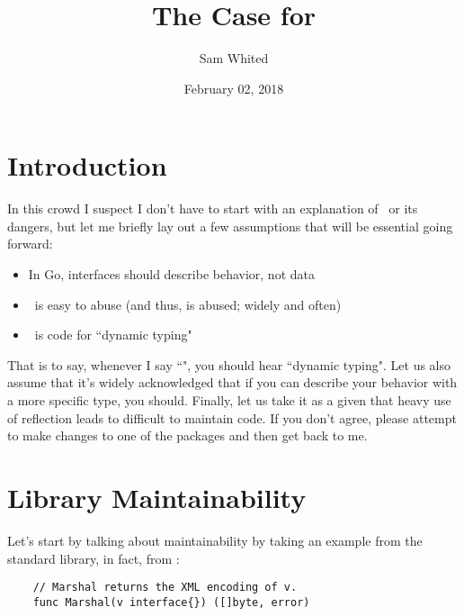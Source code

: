 \documentclass{article}
\title{The Case for \interface}
\author{Sam Whited}
\date{February 02, 2018}
\begin{document}
\maketitle
{}

\section{Introduction}

In this crowd I suspect I don't have to start with an explanation of \interface\
or its dangers, but let me briefly lay out a few assumptions that will be
essential going forward:

\begin{itemize}
	\item{In Go, interfaces should describe behavior, not data}
	\item{\interface\ is easy to abuse (and thus, is abused; widely and often)}
	\item{\interface\ is code for ``dynamic typing"}
\end{itemize}

That is to say, whenever I say ``\interface", you should hear ``dynamic typing".
Let us also assume that it's widely acknowledged that if you can describe your
behavior with a more specific type, you should.
Finally, let us take it as a given that heavy use of reflection leads to
difficult to maintain code.
If you don't agree, please attempt to make changes to one of the
\pkg{encoding/*} packages and then get back to me.

\section{Library Maintainability}

Let's start by talking about maintainability by taking an example from the
standard library, in fact, from \pkg{encoding/xml}:

\begin{lstlisting}
	// Marshal returns the XML encoding of v.
	func Marshal(v interface{}) ([]byte, error)
\end{lstlisting}
\end{document}
